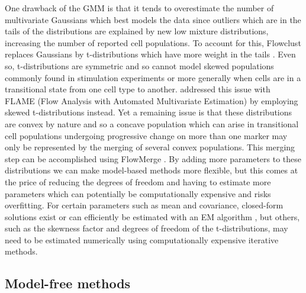 One drawback of the \gls{GMM} is that it tends to overestimate the number of multivariate Gaussians which best models the data since outliers
which are in the tails of the distributions
are explained by new low mixture distributions, increasing the number of reported cell populations.
To account for this, Flowclust replaces Gaussians by
t-distributions which have more weight in the tails \citep{Lo:2008it}.
Even so, t-distributions are symmetric and so cannot model skewed populations commonly found in stimulation experiments or more generally when cells are in a transitional state from one cell type to another.
\citet{Pyne:2009hl} addressed this issue with FLAME (Flow Analysis with Automated Multivariate Estimation) by employing skewed t-distributions instead.
Yet a remaining issue is that these distributions are convex by nature and so a concave population which can arise in transitional cell populations undergoing progressive change on more than one marker may only be represented by the merging of several convex populations.
This merging step can be accomplished using FlowMerge \citep{Finak:2009fk}.
By adding more parameters to these distributions we can make model-based methods more flexible,
but this comes at the price of reducing the degrees of freedom and having to estimate more parameters which 
can potentially be computationally expensive and risks overfitting.
For certain parameters such as mean and covariance, closed-form solutions exist or can efficiently be estimated with  an \gls{EM} algorithm \citep{Dempster:1977ul},
but others, such as the skewness factor and degrees of freedom of the t-distributions,
may need to be estimated numerically using computationally expensive iterative methods.

\subsection{Model-free methods}

